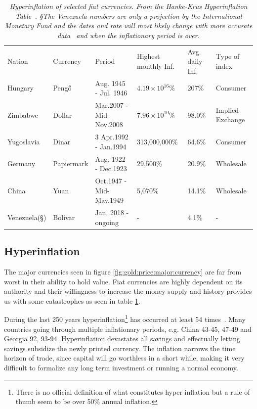 \twocolumn
\begin{table}[t]
	\begin{tabular}{llllll}
		Nation & Currency & Period & Highest monthly Inf. & Avg. daily Inf. & Type of index\\
		Hungary & Pengő & Aug. 1945 - Jul. 1946 & $ 4.19 × 10^{16}\% $ & 207\% & Consumer \\
		Zimbabwe & Dollar & Mar.2007 - Mid-Nov.2008 & $7.96 × 10^{10}\%$ & 98.0\% & Implied Exchange \\
		Yugoslavia & Dinar & 3 Apr.1992 - Jan.1994 & 313,000,000\% & 64.6\% & Consumer \\
		Germany & Papiermark & Aug. 1922 - Dec.1923 & 29,500\% & 20.9\% & Wholesale \\
		China & Yuan & Oct.1947 - Mid-May.1949 & 5,070\% & 14.1\% &	Wholesale \\
		Venezuela(§) & Bolívar & Jan. 2018 - ongoing & - & 4.1\% & - \\ 

	\end{tabular}

	\captionsetup{width=11cm}
	\caption{\textit{ Hyperinflation of selected fiat currencies. From the Hanke-Krus Hyperinflation Table~\cite{hanke:krus:hyperinflation:table}. §The Venezuela numbers are only a projection by the International Monetary Fund
			and the dates and rate will most likely change with more accurate data~\cite{hanke:hyperinflation} and when the inflationary period is over.
	}}
	\label{tab:inflation}
\end{table}

\subsection{Hyperinflation}

The major currencies seen in figure \ref{fig:gold:price:major:currency} are far from worst in their ability to hold value. Fiat currencies are highly dependent on its authority and their willingness to increase the money supply and history provides us with some catastrophes as seen in table \ref{tab:inflation}.

During the last 250 years hyperinflation\footnote{There is no official definition of what constitutes hyper inflation but a rule of thumb seem to be over 50\% annual inflation.} has occurred at least 54 times~\cite{hanke:krus:hyperinflation:table, hanke:hyperinflation}. Many countries going through multiple inflationary periods, e.g. China 43-45, 47-49 and Georgia 92, 93-94. Hyperinflation devastates all savings and effectually letting savings subsidize the newly printed currency. The inflation narrows the time horizon of trade, since capital will go worthless in a short while, making it very difficult to formalize any long term investment or running a normal economy. 

